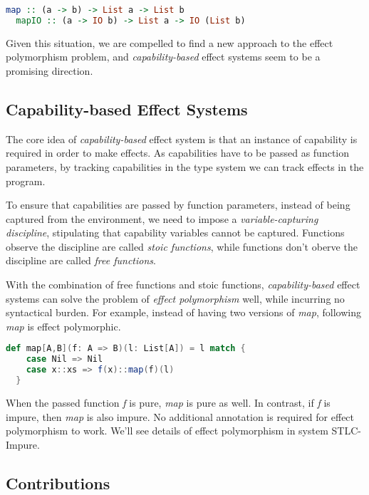 \begin{lstlisting}[language=Haskell]
  map :: (a -> b) -> List a -> List b
  mapIO :: (a -> IO b) -> List a -> IO (List b)
\end{lstlisting}

Given this situation, we are compelled to find a new approach to the
effect polymorphism problem, and \emph{capability-based} effect
systems seem to be a promising direction.

\subsection{Capability-based Effect Systems}

The core idea of \emph{capability-based} effect system is that an
instance of capability is required in order to make effects. As
capabilities have to be passed as function parameters, by tracking
capabilities in the type system we can track effects in the program.

To ensure that capabilities are passed by function parameters, instead
of being captured from the environment, we need to impose a
\emph{variable-capturing discipline}, stipulating that capability
variables cannot be captured. Functions observe the discipline are
called \emph{stoic functions}, while functions don't oberve the
discipline are called \emph{free functions}.

With the combination of free functions and stoic functions,
\emph{capability-based} effect systems can solve the problem of
\emph{effect polymorphism} well, while incurring no syntactical
burden. For example, instead of having two versions of \emph{map},
following \emph{map} is effect polymorphic.

\begin{lstlisting}[language=Scala]
  def map[A,B](f: A => B)(l: List[A]) = l match {
    case Nil => Nil
    case x::xs => f(x)::map(f)(l)
  }
\end{lstlisting}

When the passed function \emph{f} is pure, \emph{map} is pure as
well. In contrast, if \emph{f} is impure, then \emph{map} is also
impure. No additional annotation is required for effect polymorphism
to work. We'll see details of effect polymorphism in system
STLC-Impure.

\subsection{Contributions}

